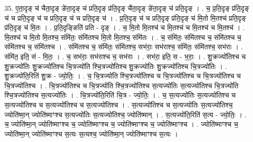\documentclass[17pt]{extarticle}
\begin{document}
35. ए॒ता॒दृङ् च॑ चैता॒दृङ् ङे॑ता॒दृङ् च॑ प्रति॒दृङ् प्र॑ति॒दृङ् चै॑ता॒दृङ् ङे॑ता॒दृङ् च॑ प्रति॒दृङ् । . च॒ प्र॒ति॒दृङ् प्र॑ति॒दृङ् च॑ च प्रति॒दृङ् च॑ च प्रति॒दृङ् च॑ च प्रति॒दृङ् च॑ । . प्र॒ति॒दृङ् च॑ च प्रति॒दृङ् प्र॑ति॒दृङ् च॑ मि॒तो मि॒तश्च॑ प्रति॒दृङ् प्र॑ति॒दृङ् च॑ मि॒तः । . प्र॒ति॒दृङ्ङिति॑ प्रति - दृङ् । . च॒ मि॒तो मि॒तश्च॑ च मि॒तश्च॑ च मि॒तश्च॑ च मि॒तश्च॑ । . मि॒तश्च॑ च मि॒तो मि॒तश्च॒ संमि॑तः॒ संमि॑तश्च मि॒तो मि॒तश्च॒ संमि॑तः । . च॒ संमि॑तः॒ संमि॑तश्च च॒ संमि॑तश्च च॒ संमि॑तश्च च॒ संमि॑तश्च । . संमि॑तश्च च॒ संमि॑तः॒ संमि॑तश्च॒ सभ॑राः॒ सभ॑राश्च॒ संमि॑तः॒ संमि॑तश्च॒ सभ॑राः । . संमि॑त॒ इति॒ सं - मि॒तः॒ । . च॒ सभ॑राः॒ सभ॑राश्च च॒ सभ॑राः । . सभ॑रा॒ इति॒ स - भ॒राः॒ । . शु॒क्रज्यो॑तिश्च च शु॒क्रज्यो॑तिः शु॒क्रज्यो॑तिश्च चि॒त्रज्यो॑ति श्चि॒त्रज्यो॑तिश्च शु॒क्रज्यो॑तिः शु॒क्रज्यो॑तिश्च चि॒त्रज्यो॑तिः । . शु॒क्रज्यो॑ति॒रिति॑ शु॒क्र - ज्यो॒तिः॒ । . च॒ चि॒त्रज्यो॑ति श्चि॒त्रज्यो॑तिश्च च चि॒त्रज्यो॑तिश्च च चि॒त्रज्यो॑तिश्च च चि॒त्रज्यो॑तिश्च । . चि॒त्रज्यो॑तिश्च च चि॒त्रज्यो॑ति श्चि॒त्रज्यो॑तिश्च स॒त्यज्यो॑तिः स॒त्यज्यो॑तिश्च चि॒त्रज्यो॑ति श्चि॒त्रज्यो॑तिश्च स॒त्यज्यो॑तिः । . चि॒त्रज्यो॑ति॒रिति॑ चि॒त्र - ज्यो॒तिः॒ । . च॒ स॒त्यज्यो॑तिः स॒त्यज्यो॑तिश्च च स॒त्यज्यो॑तिश्च च स॒त्यज्यो॑तिश्च च स॒त्यज्यो॑तिश्च । . स॒त्यज्यो॑तिश्च च स॒त्यज्यो॑तिः स॒त्यज्यो॑तिश्च॒ ज्योति॑ष्मा॒न् ज्योति॑ष्माꣳश्च स॒त्यज्यो॑तिः स॒त्यज्यो॑तिश्च॒ ज्योति॑ष्मान् । . स॒त्यज्यो॑ति॒रिति॑ स॒त्य - ज्यो॒तिः॒ । . च॒ ज्योति॑ष्मा॒न् ज्योति॑ष्माꣳश्च च॒ ज्योति॑ष्माꣳश्च च॒ ज्योति॑ष्माꣳश्च च॒ ज्योति॑ष्माꣳश्च । . ज्योति॑ष्माꣳश्च च॒ ज्योति॑ष्मा॒न् ज्योति॑ष्माꣳश्च स॒त्यः स॒त्यश्च॒ ज्योति॑ष्मा॒न् ज्योति॑ष्माꣳश्च स॒त्यः । \newline
\end{document}

